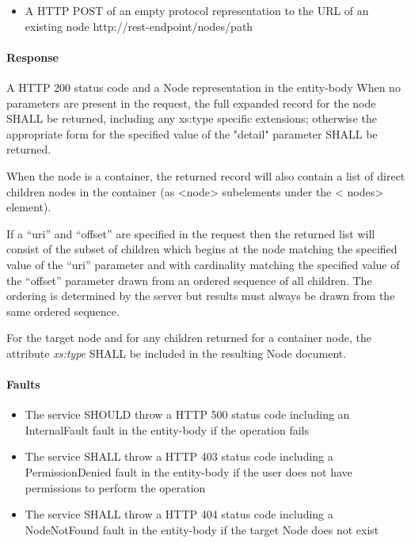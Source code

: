 \documentclass[11pt,a4paper]{ivoa}
\begin{document}
\begin{itemize}
    \item A HTTP POST of an empty protocol representation to the URL of an existing node http://rest-endpoint/nodes/path
\end{itemize}
    
\paragraph{Response}
A HTTP 200 status code and a Node representation in the entity-body
When no parameters are present in the request, the full expanded record for the node SHALL be returned, including any xs:type specific extensions; otherwise the appropriate form for the specified value of the "detail" parameter SHALL be returned.

When the node is a container, the returned record will also contain a list of direct children nodes in the container (as <node> subelements under the < nodes> element).

If a ``uri'' and ``offset'' are specified in the request then the returned list will consist of the subset of children which begins at the node matching the specified value of the ``uri'' parameter and with cardinality matching the specified value of the ``offset'' parameter drawn from an ordered sequence of all children. The ordering is determined by the server but results must always be drawn from the same ordered sequence.

For the target node and for any children returned for a container node, the attribute \emph{xs:type} SHALL be included in the resulting Node document.  

\paragraph{Faults}
\begin{itemize}
    \item The service SHOULD throw a HTTP 500 status code including an InternalFault fault in the entity-body if the operation fails
    \item The service SHALL throw a HTTP 403 status code including a PermissionDenied fault in the entity-body if the user does not have permissions to perform the operation
    \item The service SHALL throw a HTTP 404 status code including a NodeNotFound fault in the entity-body if the target Node does not exist
\end{itemize}
\end{document}
